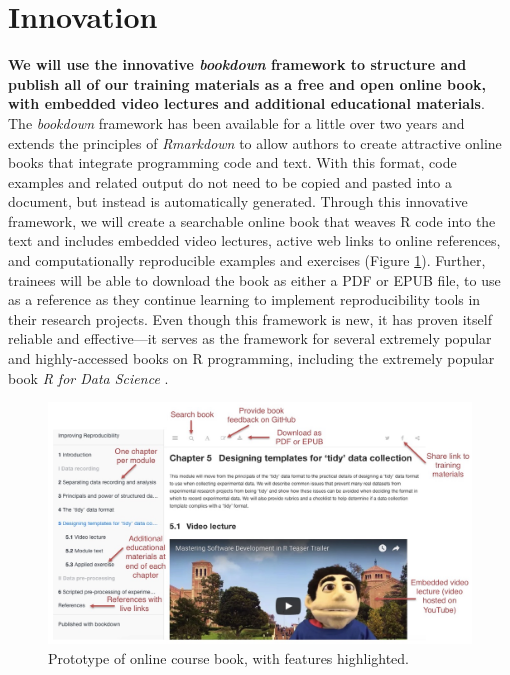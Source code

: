 \documentclass[pdftex,english,11pt,parskip=half]{scrartcl}
\begin{document}
\section{Innovation} \vspace{-0.1in}

\textbf{We will use the
innovative \textit{bookdown} framework \cite{xie2016bookdown} to structure and
publish all of our training materials as a free and open online book, with embedded video lectures and additional educational materials}. The
\textit{bookdown} framework has been available for a little over two years and
extends the principles of \textit{Rmarkdown} \cite{xie2015dynamic} to allow authors to create attractive
online books that integrate programming code and text. With this format, code examples and related
output do not need to be copied and pasted into a document, but instead is
automatically generated. Through this innovative framework, we
will create a searchable online book that weaves R code into the text
and includes embedded video lectures, active web links to online
references, and computationally reproducible examples and exercises
(Figure \ref{fig:prototype}). Further, trainees will be able to
download the book as either a PDF or EPUB file, to use as a reference as they
continue learning to implement reproducibility tools in their research projects. Even though this framework is new, it has proven
itself reliable and effective---it serves as the framework for several extremely
popular and highly-accessed books on R programming, including the extremely popular book \textit{R for Data
Science} \cite{wickham2016r}. 

\begin{figure}[t] \includegraphics[width =
\textwidth]{figures/book_prototype.jpg} \caption{Prototype of online course
book, with features highlighted.} \label{fig:prototype} \end{figure}
\end{document}
